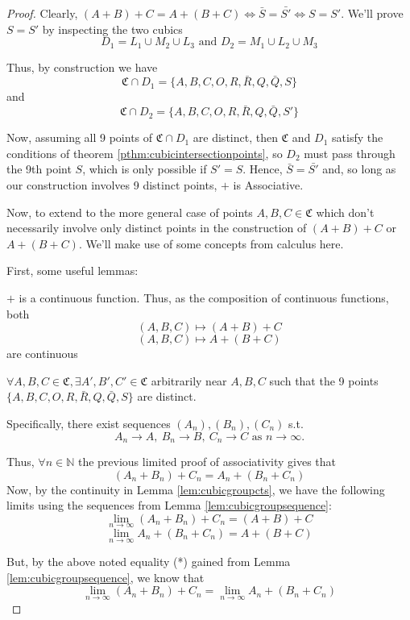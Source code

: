 \begin{proof}
Clearly, $(A+B)+C = A+(B+C) \iff \bar{S}=\bar{S'} \iff S=S'$. We'll prove $S=S'$ by inspecting the two cubics
\[
	D_1 = L_1 \cup M_2 \cup L_3 \text{ and } D_2 = M_1 \cup L_2 \cup M_3
\]

Thus, by construction we have
\[
	\mathfrak{C} \cap D_1 = \{A, B, C, O, R, \bar{R}, Q, \bar{Q}, S\}
\]
and
\[
	\mathfrak{C} \cap D_2 = \{A, B, C, O, R, \bar{R}, Q, \bar{Q}, S'\}
\]

Now, assuming all 9 points of $\mathfrak{C} \cap D_1$ are distinct, then $\mathfrak{C}$ and $D_1$
satisfy the conditions of theorem \ref{pthm:cubicintersectionpoints},
so $D_2$ must pass through the 9th point $S$, which is only possible if $S'=S$.
Hence, $\bar{S} = \bar{S'}$ and, so long as our construction involves 9 distinct points,
$+$ is Associative.

Now, to extend to the more general case of points $A,B,C \in \mathfrak{C}$
which don't necessarily involve only distinct points in the construction
of $(A+B)+C$ or $A+(B+C)$. We'll make use of some concepts from calculus here.

First, some useful lemmas:
\begin{lemma}
\label{lem:cubicgroupcts}
$+$ is a continuous function. Thus, as the composition of continuous functions, both
\[
(A,B,C) \mapsto (A+B)+C
\]
\[
(A,B,C) \mapsto A+(B+C)
\]
are continuous
\end{lemma}

\begin{lemma}
\label{lem:cubicgroupsequence}
$\forall A,B,C \in \mathfrak{C}, \exists A',B',C' \in \mathfrak{C}$ arbitrarily near $A,B,C$
such that the 9 points $\{A,B,C,O,R,\bar{R},Q,\bar{Q},S\}$ are distinct.

Specifically, there exist sequences $(A_n), (B_n), (C_n)$ s.t.
\[
A_n \to A,~B_n \to B,~C_n \to C \text{ as } n \to \infty.
\]
\end{lemma}

Thus, $\forall n \in \mathbb{N}$ the previous limited proof of associativity gives
that 
\[
	(A_n+B_n)+C_n = A_n+(B_n+C_n) \tag{*}
\]
Now, by the continuity in Lemma \ref{lem:cubicgroupcts},
we have the following limits using the sequences from Lemma \ref{lem:cubicgroupsequence}:
\[
	\lim_{n \to \infty} (A_n + B_n) + C_n = (A+B)+C
\]
\[
	\lim_{n \to \infty} A_n + (B_n + C_n) = A+(B+C)
\]

But, by the above noted equality (*) gained from Lemma \ref{lem:cubicgroupsequence},
we know that 
\[
	\lim_{n \to \infty} (A_n + B_n) + C_n = \lim_{n \to \infty} A_n + (B_n + C_n) 
\]


\end{proof}
